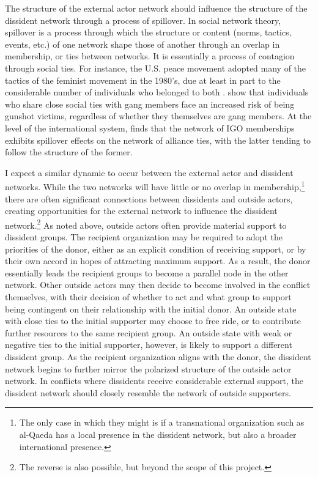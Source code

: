 The structure of the external actor network should influence the structure of the dissident network through a process of spillover. In social network theory, spillover is a process through which the structure or content (norms, tactics, events, etc.) of one network shape those of another through an overlap in membership, or ties between networks. It is essentially a process of contagion through social ties. For instance, the U.S. peace movement adopted many of the tactics of the feminist movement in the 1980's, due at least in part to the considerable number of individuals who belonged to both \citep{Meyer1994}. \citet{Papachristos2015} show that individuals who share close social ties with gang members face an increased risk of being gunshot victims, regardless of whether they themselves are gang members. At the level of the international system, \cite{Maoz2011} finds that the network of IGO memberships exhibits spillover effects on the network of alliance ties, with the latter tending to follow the structure of the former.

I expect a similar dynamic to occur between the external actor and dissident networks. While the two networks will have little or no overlap in membership,\footnote{The only case in which they might is if a transnational organization such as al-Qaeda has a local presence in the dissident network, but also a broader international presence.} there are often significant connections between dissidents and outside actors, creating opportunities for the external network to influence the dissident network.\footnote{The reverse is also possible, but beyond the scope of this project.} As noted above, outside actors often provide material support to dissident groups. The recipient organization may be required to adopt the priorities of the donor, either as an explicit condition of receiving support, or by their own accord in hopes of attracting maximum support. As a result, the donor essentially leads the recipient groups to become a parallel node in the other network. Other outside actors may then decide to become involved in the conflict themselves, with their decision of whether to act and what group to support being contingent on their relationship with the initial donor. An outside state with close ties to the initial supporter may choose to free ride, or to contribute further resources to the same recipient group. An outside state with weak or negative ties to the initial supporter, however, is likely to support a different dissident group. As the recipient organization aligns with the donor, the dissident network begins to further mirror the polarized structure of the outside actor network. In conflicts where dissidents receive considerable external support, the dissident network should closely resemble the network of outside supporters.

